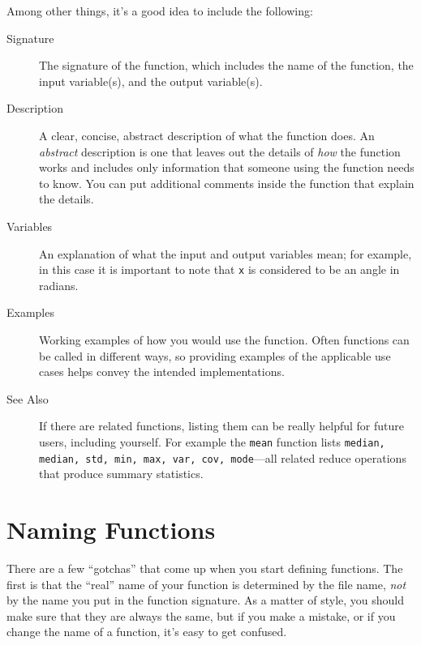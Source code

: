 \documentclass[../../book.tex]{subfiles}
\begin{document}
Among other things, it's a good idea to
include the following:

\begin{description}

\item [Signature] The signature of the function, which includes the name
of the function, the input variable(s), and the output variable(s).

\item [Description] A clear, concise, abstract description of what the function does.
An \emph{abstract} description is one that leaves out the
details of \emph{how} the function works and includes only information
that someone  using the function needs to know.  You can put additional
comments inside the function that explain the details.

\item [Variables] An explanation of what the input and output variables mean; for example,
in this case it is important to note that \lstinline{x} is considered
to be an angle in radians.

\item [Examples] Working examples of how you would use the function.  Often functions can be called in different ways, so providing examples of the applicable use cases helps convey the intended implementations.

\item [See Also] If there are related functions, listing them can be really helpful for future users, including yourself.  For example the \lstinline{mean} function lists \lstinline{median, median, std, min, max, var, cov, mode}---all related reduce operations that produce summary statistics.

\end{description}


\section{Naming Functions}

There are a few ``gotchas'' that come up when you start defining functions.
The first is that the ``real'' name of your function is determined by the file name, \emph{not} by the name you put in the function signature.  As a matter of style, you
should make sure that they are always the same, but if you
make a mistake, or if you change the name of a function, it's
easy to get confused.
\end{document}
